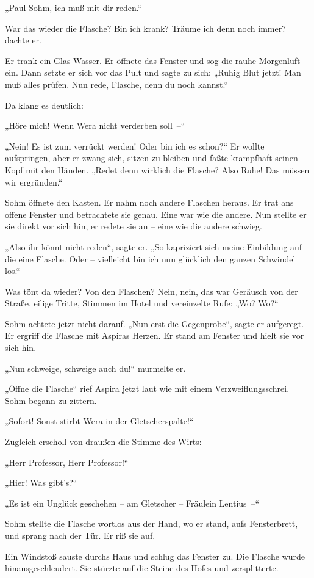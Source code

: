 „Paul Sohm, ich muß mit dir reden.“

War das wieder die Flasche? Bin ich krank? Träume ich denn noch
immer? dachte er.

Er trank ein Glas Wasser. Er öffnete das Fenster und sog die rauhe
Morgenluft ein. Dann setzte er sich vor das Pult und sagte zu sich:
„Ruhig Blut jetzt! Man muß alles prüfen. Nun rede, Flasche, denn du
noch kannst.“

Da klang es deutlich:

„Höre mich! Wenn Wera nicht verderben soll~–“

„Nein! Es ist zum verrückt werden! Oder bin ich es schon?“ Er
wollte aufspringen, aber er zwang sich, sitzen zu bleiben und faßte
krampfhaft seinen Kopf mit den Händen. „Redet denn wirklich die
Flasche? Also Ruhe! Das müssen wir ergründen.“

Sohm öffnete den Kasten. Er nahm noch andere Flaschen heraus. Er
trat ans offene Fenster und betrachtete sie genau. Eine war wie die
andere. Nun stellte er sie direkt vor sich hin, er redete sie an –
eine wie die andere schwieg.

„Also ihr könnt nicht reden“, sagte er. „So kapriziert sich meine
Einbildung auf die eine Flasche. Oder – vielleicht bin ich nun
glücklich den ganzen Schwindel los.“

Was tönt da wieder? Von den Flaschen? Nein, nein, das war Geräusch
von der Straße, eilige Tritte, Stimmen im Hotel und vereinzelte
Rufe: „Wo? Wo?“

Sohm achtete jetzt nicht darauf. „Nun erst die Gegenprobe“, sagte
er aufgeregt. Er ergriff die Flasche mit Aspiras Herzen. Er stand
am Fenster und hielt sie vor sich hin.

„Nun schweige, schweige auch du!“ murmelte er.

„Öffne die Flasche“ rief Aspira jetzt laut wie mit einem
Verzweiflungsschrei. Sohm begann zu zittern.

„Sofort! Sonst stirbt Wera in der Gletscherspalte!“

Zugleich erscholl von draußen die Stimme des Wirts:

„Herr Professor, Herr Professor!“

„Hier! Was gibt's?“

„Es ist ein Unglück geschehen – am Gletscher – Fräulein Lentius~–“

Sohm stellte die Flasche wortlos aus der Hand, wo er stand, aufs
Fensterbrett, und sprang nach der Tür. Er riß sie auf.

Ein Windstoß sauste durchs Haus und schlug das Fenster zu. Die
Flasche wurde hinausgeschleudert. Sie stürzte auf die Steine des
Hofes und zersplitterte.

